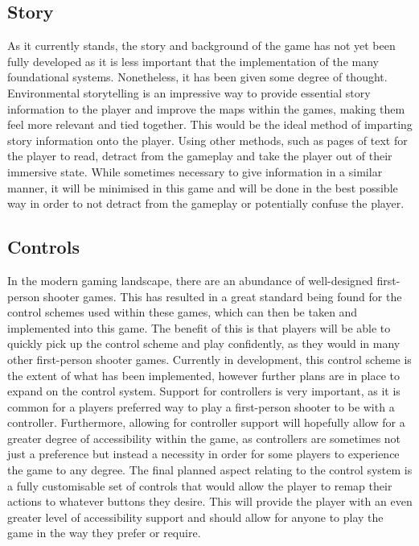 \documentclass[11pt]{article}
\begin{document}
\subsection{Story}
As it currently stands, the story and background of the game has not yet been fully developed as it is less important that the implementation of the many foundational systems. Nonetheless, it has been given some degree of thought. 
Environmental storytelling is an impressive way to provide essential story information to the player and improve the maps within the games, making them feel more relevant and tied together. This would be the ideal method of imparting story information onto the player. 
Using other methods, such as pages of text for the player to read, detract from the gameplay and take the player out of their immersive state. While sometimes necessary to give information in a similar manner, it will be minimised in this game and will be done in the best possible way in order to not detract from the gameplay or potentially confuse the player. \\

\subsection{Controls}
In the modern gaming landscape, there are an abundance of well-designed first-person shooter games. This has resulted in a great standard being found for the control schemes used within these games, which can then be taken and implemented into this game. The benefit of this is that players will be able to quickly pick up the control scheme and play confidently, as they would in many other first-person shooter games. 
Currently in development, this control scheme is the extent of what has been implemented, however further plans are in place to expand on the control system. Support for controllers is very important, as it is common for a players preferred way to play a first-person shooter to be with a controller. Furthermore, allowing for controller support will hopefully allow for a greater degree of accessibility within the game, as controllers are sometimes not just a preference but instead a necessity in order for some players to experience the game to any degree. 
The final planned aspect relating to the control system is a fully customisable set of controls that would allow the player to remap their actions to whatever buttons they desire. This will provide the player with an even greater level of accessibility support and should allow for anyone to play the game in the way they prefer or require. \\
\end{document}
